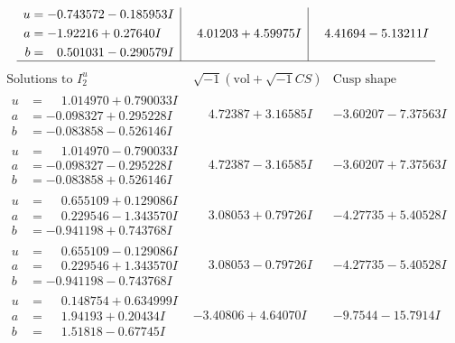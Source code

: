 \documentclass[1p]{elsarticle_modified}
\theoremstyle{definition}
\newcommand{\I}{\sqrt{-1}}
\begin{document}
$$\begin{array}{c|c|c}
\begin{aligned}
u &= -0.743572 - 0.185953 I \\
a &= -1.92216 + 0.27640 I \\
b &= \phantom{-}0.501031 - 0.290579 I\end{aligned}
 & \phantom{-}4.01203 + 4.59975 I & \phantom{-}4.41694 - 5.13211 I\\
 \hline 
 \end{array}$$\newpage$$\begin{array}{c|c|c}  
\text{Solutions to }I^u_{2}& \I (\text{vol} + \sqrt{-1}CS) & \text{Cusp shape}\\
 \hline 
\begin{aligned}
u &= \phantom{-}1.014970 + 0.790033 I \\
a &= -0.098327 + 0.295228 I \\
b &= -0.083858 - 0.526146 I\end{aligned}
 & \phantom{-}4.72387 + 3.16585 I & -3.60207 - 7.37563 I \\ \hline\begin{aligned}
u &= \phantom{-}1.014970 - 0.790033 I \\
a &= -0.098327 - 0.295228 I \\
b &= -0.083858 + 0.526146 I\end{aligned}
 & \phantom{-}4.72387 - 3.16585 I & -3.60207 + 7.37563 I \\ \hline\begin{aligned}
u &= \phantom{-}0.655109 + 0.129086 I \\
a &= \phantom{-}0.229546 - 1.343570 I \\
b &= -0.941198 + 0.743768 I\end{aligned}
 & \phantom{-}3.08053 + 0.79726 I & -4.27735 + 5.40528 I \\ \hline\begin{aligned}
u &= \phantom{-}0.655109 - 0.129086 I \\
a &= \phantom{-}0.229546 + 1.343570 I \\
b &= -0.941198 - 0.743768 I\end{aligned}
 & \phantom{-}3.08053 - 0.79726 I & -4.27735 - 5.40528 I \\ \hline\begin{aligned}
u &= \phantom{-}0.148754 + 0.634999 I \\
a &= \phantom{-}1.94193 + 0.20434 I \\
b &= \phantom{-}1.51818 - 0.67745 I\end{aligned}
 & -3.40806 + 4.64070 I & -9.7544 - 15.7914 I \\ \hline\begin{aligned}

\end{aligned}
\end{array}$$
\end{document}
